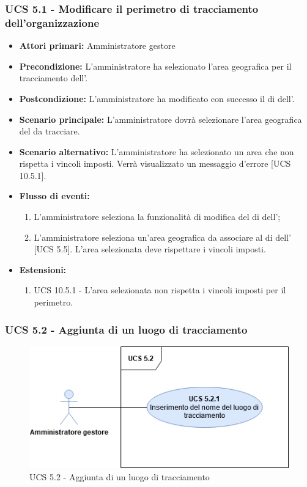 \subsubsection{UCS 5.1 - Modificare il perimetro di tracciamento dell'organizzazione}%
\begin{itemize}
    \item \textbf{Attori primari:} Amministratore gestore
    \item \textbf{Precondizione:} L'amministratore ha selezionato l’area geografica per il tracciamento dell'.
    \item \textbf{Postcondizione:} L'amministratore ha modificato con successo il  di  dell'.
    \item \textbf{Scenario principale:} L'amministratore dovrà selezionare l'area geografica del  da tracciare.
     \item \textbf{Scenario alternativo:} L'amministratore ha selezionato un area che non rispetta i vincoli imposti. Verrà visualizzato un messaggio d'errore [UCS 10.5.1].
    \item \textbf{Flusso di eventi:}
    \begin{enumerate}%
        \item L'amministratore seleziona la funzionalità di modifica del  di  dell';
        \item L'amministratore seleziona un'area geografica da associare al  di  dell' [UCS 5.5]. L'area selezionata deve rispettare i vincoli imposti.
    \end{enumerate}
    \item \textbf{Estensioni:}
    \begin{enumerate}
        \item UCS 10.5.1 - L'area selezionata non rispetta i vincoli imposti per il perimetro.
    \end{enumerate}
\end{itemize}

\subsubsection{UCS 5.2 - Aggiunta di un luogo di tracciamento}%

\begin{figure}[h]
	\centering
    \includegraphics[scale=0.50]{Sezioni/UseCase/Immagini/UCS5.2.png}
    \caption{UCS 5.2 - Aggiunta di un luogo di tracciamento}
\end{figure}

